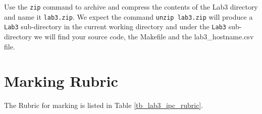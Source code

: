\begin{enumerate}
\end{enumerate}
Use the \verb+zip+ command to archive and compress the contents of the Lab3 directory and name it \verb+lab3.zip+. We expect the command \verb+unzip lab3.zip+ will produce a \verb+Lab3+ sub-directory in the current working directory and under the \verb+Lab3+ sub-directory we will find your source code, the Makefile and the lab3\_hostname.csv file.

\section{Marking Rubric}
The Rubric for marking is listed in Table \ref{tb_lab3_ipc_rubric}.

